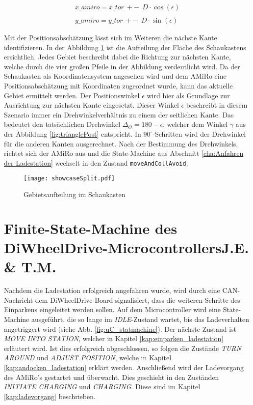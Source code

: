 \begin{equation}
	\begin{aligned}
		x\_amiro = x\_tor~+-~~D \cdot \cos(\epsilon) \\\\
		y\_amiro = y\_tor~+-~~D \cdot \sin(\epsilon)
		\label{eq:positionCoords}
	\end{aligned}
\end{equation}

Mit der Positionsabschätzung lässt sich im Weiteren die nächste Kante identifizieren. In der Abbildung \ref{fig:showcaseSplit} ist die Aufteilung der Fläche des Schaukastens ersichtlich. Jedes Gebiet beschreibt dabei die Richtung zur nächsten Kante, welche durch die vier großen Pfeile in der Abbildung verdeutlicht wird. Da der Schaukasten als Koordinatensystem angesehen wird und dem AMiRo eine Positionsabschätzung mit Koordinaten zugeordnet wurde, kann das aktuelle Gebiet ermittelt werden. Der Positionswinkel $\epsilon$ wird hier als Grundlage zur Ausrichtung zur nächsten Kante eingesetzt. Dieser Winkel $\epsilon$ beschreibt in diesem Szenario immer ein Drehwinkelverhältnis zu einem der seitlichen Kante. Das bedeutet den tatsächlichen Drehwinkel $\Delta_\Theta = 180 - \epsilon$, welcher dem Winkel $\gamma$ aus der Abbildung \ref{fig:trianglePost} entspricht. In $90^\circ$-Schritten wird der Drehwinkel für die anderen Kanten ausgerechnet. Nach der Bestimmung des Drehwinkels, richtet sich der AMiRo aus und die State-Machine aus Abschnitt \ref{cha:Anfahren der Ladestation} wechselt in den Zustand \texttt{moveAndCollAvoid}.

\begin{figure}[h]
	\begin{center}
		\texttt{[image: showcaseSplit.pdf]} 	
		\caption{Gebietsaufteilung im Schaukasten}
		\label{fig:showcaseSplit}
	\end{center}
\end{figure}

\section[Finite-State-Machine des DiWheelDrive-Microcontrollers]{Finite-State-Machine des DiWheelDrive-Microcontrollers\hfill {\normalsize J.E. \& T.M.}} %

Nachdem die Ladestation erfolgreich angefahren wurde, wird durch eine CAN-Nachricht dem DiWheelDrive-Board signalisiert, dass die weiteren Schritte des Einparkens eingeleitet werden sollen.
Auf dem Microcontroller wird eine State-Machine ausgeführt, die so lange im \textit{IDLE}-Zustand wartet, bis das Ladeverhalten angetriggert wird (siehe Abb. \ref{fig:uC_statmachine}).
Der nächste Zustand ist \textit{MOVE INTO STATION}, welcher in Kapitel \ref{kap:einparken_ladestation} erläutert wird. Ist dies erfolgreich abgeschlossen, so folgen die Zustände \textit{TURN AROUND} und \textit{ADJUST POSITION}, welche in Kapitel \ref{kap:andocken_ladestation} erklärt werden. Anschließend wird der Ladevorgang des AMiRo's gestartet und überwacht. Dies geschieht in den Zuständen \textit{INITIATE CHARGING} und \textit{CHARGING}. Diese sind im Kapitel \ref{kap:ladevorgang} beschrieben.

